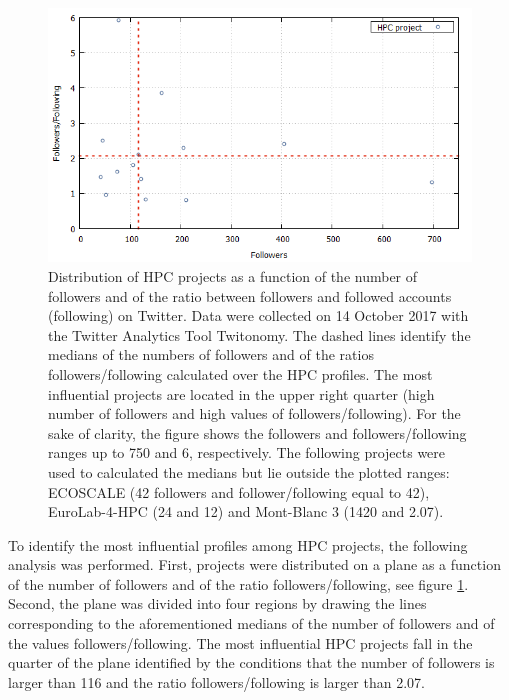 \begin{figure}[!t] 
 \begin{center}
 \includegraphics[scale=0.4]{Images/HPC_influence.png}
 \caption{Distribution of HPC projects as a function of the number of followers and of the ratio between followers and followed accounts (following) on Twitter. Data were collected on 14 October 2017 with the Twitter Analytics Tool Twitonomy. The dashed lines identify the medians of the numbers of followers and of the ratios followers/following calculated over the HPC profiles. The most influential projects are located in the upper right quarter (high number of followers and high values of followers/following). For the sake of clarity, the figure shows the followers and followers/following ranges up to 750 and 6, respectively. The following projects were used to calculated the medians but lie outside the plotted ranges: ECOSCALE (42 followers and follower/following equal to 42), EuroLab-4-HPC (24 and 12) and Mont-Blanc 3 (1420 and 2.07).}
 \label{HPC_influence_plot}
 \end{center}
\end{figure}

To identify the most influential profiles among HPC projects, the following analysis was performed. First, projects were distributed on a plane as a function of the number of followers and of the ratio followers/following, see figure \ref{HPC_influence_plot}. Second, the plane was divided into four regions by drawing the lines corresponding to the aforementioned medians of the number of followers and of the values followers/following. The most influential HPC projects fall in the quarter of the plane identified by the conditions that the number of followers is larger than 116 and the ratio followers/following is larger than 2.07.

